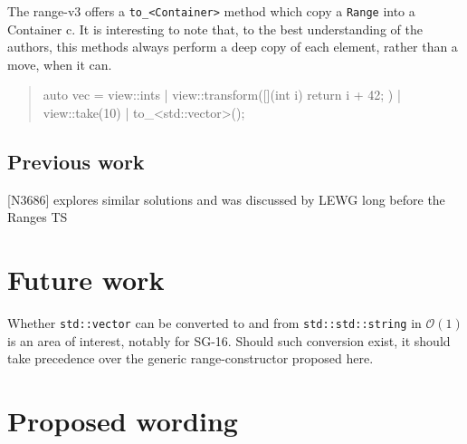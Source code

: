 \documentclass{wg21}
\newcommand{\cc}[1]{\texttt{#1}}
\begin{document}
The range-v3 offers a  \cc{to_<Container>} method which copy a \cc{Range} into a Container c.
It is interesting to note that, to the best understanding of the authors, this methods always
perform a deep copy of each element, rather than a move, when it can.

\begin{quote}
\begin{codeblock}
auto vec = view::ints 
	| view::transform([](int i) {
		return i + 42;
	}) 
	| view::take(10)
	| to_<std::vector>();
\end{codeblock}
\end{quote}

\subsection{Previous work}

[N3686] explores similar solutions and was discussed by LEWG long before the Ranges TS

\section{Future work}

Whether \cc{std::vector} can be converted to and from \cc{std::std::string} in $\mathcal{O}(1)$ is an area of interest, notably for SG-16.
Should such conversion exist, it should take precedence over the generic range-constructor proposed here.

\section{Proposed wording}

\end{document}
